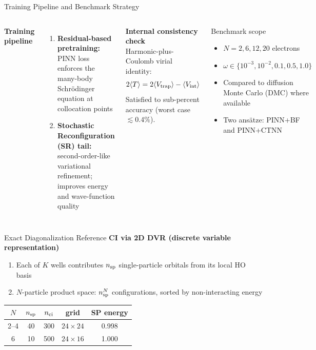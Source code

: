 \documentclass[aspectratio=169,10pt]{beamer}
\begin{document}
\begin{frame}{Training Pipeline and Benchmark Strategy}
  \begin{columns}[T]
      \textbf{Training pipeline}
      \begin{enumerate}
        \item \textbf{Residual-based pretraining:}
              PINN loss enforces the many-body Schr\"odinger equation
              at collocation points
        \item \textbf{Stochastic Reconfiguration (SR) tail:}
              second-order-like variational refinement; improves energy
              and wave-function quality
      \end{enumerate}
      \vspace{0.3cm}
      \textbf{Internal consistency check}\\
      Harmonic-plus-Coulomb virial identity:
      \[
        2\langle T\rangle = 2\langle V_{\rm trap}\rangle
        - \langle V_{\rm int}\rangle
      \]
      Satisfied to sub-percent accuracy (worst case $\lesssim 0.4\%$).
      \begin{block}{Benchmark scope}
        \begin{itemize}
          \item $N=2,6,12,20$ electrons
          \item $\omega\in\{10^{-3},10^{-2},0.1,0.5,1.0\}$
          \item Compared to diffusion Monte Carlo (DMC) where available
          \item Two ans\"atze: PINN+BF and PINN+CTNN
        \end{itemize}
      \end{block}
  \end{columns}
\end{frame}


\begin{frame}{Exact Diagonalization Reference}
      \textbf{CI via 2D DVR (discrete variable representation)}
      \begin{enumerate}
        \item Each of $K$ wells contributes $n_{\rm sp}$ single-particle
              orbitals from its local HO basis
        \item $N$-particle product space: $n_{\rm sp}^N$ configurations,
              sorted by non-interacting energy
      \end{enumerate}
      \begin{tabular}{c|ccc|c}
        \toprule
        $N$ & $n_{\rm sp}$ & $n_{\rm ci}$ & grid & SP energy \\
        \midrule
        2--4 & 40  & 300 & $24\!\times\!24$ & 0.998 \\
        6    & 10  & 500 & $24\!\times\!16$ & 1.000 \\
        \bottomrule
      \end{tabular}
\end{frame}
\end{document}
